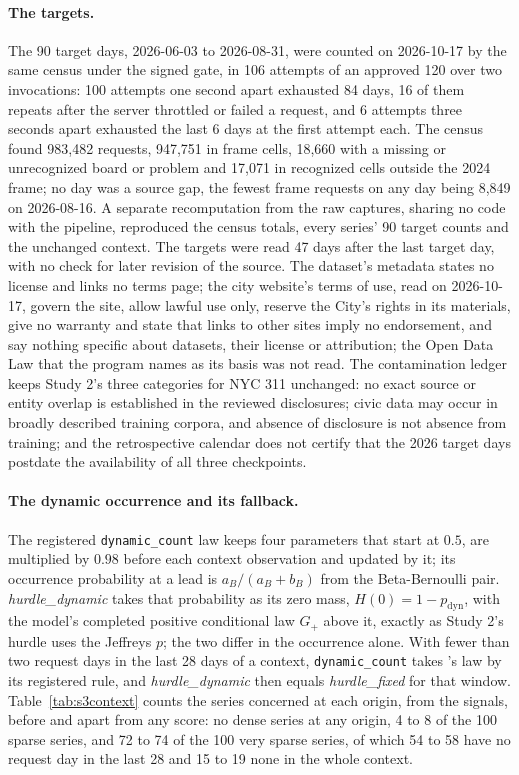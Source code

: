 \paragraph{The targets.} The 90 target days, 2026-06-03 to 2026-08-31, were counted on 2026-10-17 by the
same census under the signed gate, in 106 attempts of an approved 120 over two invocations: 100 attempts one
second apart exhausted 84 days, 16 of them repeats after the server throttled or failed a request, and 6
attempts three seconds apart exhausted the last 6 days at the first attempt each. The census found 983,482
requests, 947,751 in frame cells, 18,660 with a missing or unrecognized board or problem and 17,071 in
recognized cells outside the 2024 frame; no day was a source gap, the fewest frame requests on any day being
8,849 on 2026-08-16. A separate recomputation from the raw captures, sharing no code with the pipeline,
reproduced the census totals, every series' 90 target counts and the unchanged context. The targets were
read 47 days after the last target day, with no check for later revision of the source. The dataset's
metadata states no license and links no terms page; the city website's terms of use, read on 2026-10-17,
govern the site, allow lawful use only, reserve the City's rights in its materials, give no warranty and
state that links to other sites imply no endorsement, and say nothing specific about datasets, their license
or attribution; the Open Data Law that the program names as its basis was not read. The contamination
ledger keeps Study 2's three categories for NYC 311 unchanged: no exact source or entity overlap is
established in the reviewed disclosures; civic data may occur in broadly described training corpora, and
absence of disclosure is not absence from training; and the retrospective calendar does not certify that the
2026 target days postdate the availability of all three checkpoints.

\paragraph{The dynamic occurrence and its fallback.} The registered \texttt{dynamic\_count} law keeps four
parameters that start at $0.5$, are multiplied by $0.98$ before each context observation and updated by it;
its occurrence probability at a lead is $a_B / (a_B + b_B)$ from the Beta-Bernoulli pair. \emph{hurdle\_dynamic}
takes that probability as its zero mass, $H(0) = 1 - p_{\text{dyn}}$, with the model's completed positive
conditional law $G_+$ above it, exactly as Study 2's hurdle uses the Jeffreys $p$; the two differ in the
occurrence alone. With fewer than two request days in the last 28 days of a context, \texttt{dynamic\_count}
takes \hc{}'s law by its registered rule, and \emph{hurdle\_dynamic} then equals \emph{hurdle\_fixed} for that
window. Table~\ref{tab:s3context} counts the series concerned at each origin, from the signals, before and
apart from any score: no dense series at any origin, 4 to 8 of the 100 sparse series, and 72 to 74 of the
100 very sparse series, of which 54 to 58 have no request day in the last 28 and 15 to 19 none in the whole
context.

